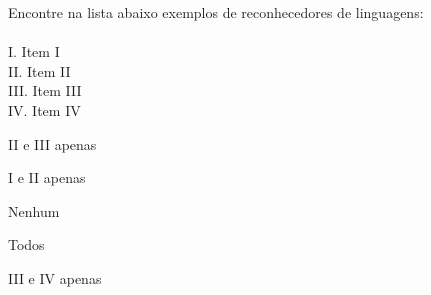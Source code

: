 \question[10]
Encontre na lista abaixo exemplos de reconhecedores de linguagens:\\
\\
I. Item I\\
II. Item II\\
III. Item III\\
IV. Item IV
\\
\begin{choices}
\item II e III apenas
\item I e II apenas
\item Nenhum %
\item Todos
\item III e IV apenas
\end{choices}
\answerline

